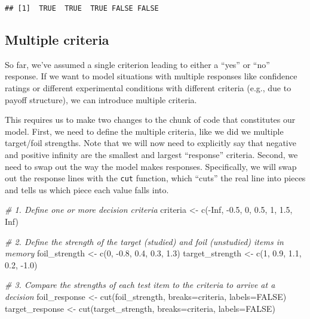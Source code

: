 \documentclass[
]{book}
\newenvironment{Shaded}{\begin{snugshade}}{\end{snugshade}}
\newcommand{\AttributeTok}[1]{\textcolor[rgb]{0.77,0.63,0.00}{#1}}
\newcommand{\CommentTok}[1]{\textcolor[rgb]{0.56,0.35,0.01}{\textit{#1}}}
\newcommand{\ConstantTok}[1]{\textcolor[rgb]{0.00,0.00,0.00}{#1}}
\newcommand{\DecValTok}[1]{\textcolor[rgb]{0.00,0.00,0.81}{#1}}
\newcommand{\FloatTok}[1]{\textcolor[rgb]{0.00,0.00,0.81}{#1}}
\newcommand{\FunctionTok}[1]{\textcolor[rgb]{0.00,0.00,0.00}{#1}}
\newcommand{\NormalTok}[1]{#1}
\newcommand{\OtherTok}[1]{\textcolor[rgb]{0.56,0.35,0.01}{#1}}
\newcommand{\SpecialCharTok}[1]{\textcolor[rgb]{0.00,0.00,0.00}{#1}}
\begin{document}
\begin{verbatim}
## [1]  TRUE  TRUE  TRUE FALSE FALSE
\end{verbatim}

\hypertarget{multiple-criteria}{%
\subsection{Multiple criteria}\label{multiple-criteria}}

So far, we've assumed a single criterion leading to either a ``yes'' or ``no'' response. If we want to model situations with multiple responses like confidence ratings or different experimental conditions with different criteria (e.g., due to payoff structure), we can introduce multiple criteria.

This requires us to make two changes to the chunk of code that constitutes our model. First, we need to define the multiple criteria, like we did we multiple target/foil strengths. Note that we will now need to explicitly say that negative and positive infinity are the smallest and largest ``response'' criteria. Second, we need to swap out the way the model makes responses. Specifically, we will swap out the response lines with the \texttt{cut} function, which ``cuts'' the real line into pieces and tells us which piece each value falls into.

\begin{Shaded}
\begin{Highlighting}[]
\CommentTok{\# 1. Define one or more decision criteria}
\NormalTok{criteria }\OtherTok{\textless{}{-}} \FunctionTok{c}\NormalTok{(}\SpecialCharTok{{-}}\ConstantTok{Inf}\NormalTok{, }\SpecialCharTok{{-}}\FloatTok{0.5}\NormalTok{, }\DecValTok{0}\NormalTok{, }\FloatTok{0.5}\NormalTok{, }\DecValTok{1}\NormalTok{, }\FloatTok{1.5}\NormalTok{, }\ConstantTok{Inf}\NormalTok{)}

\CommentTok{\# 2. Define the strength of the target (studied) and foil (unstudied) items in memory}
\NormalTok{foil\_strength }\OtherTok{\textless{}{-}} \FunctionTok{c}\NormalTok{(}\DecValTok{0}\NormalTok{, }\SpecialCharTok{{-}}\FloatTok{0.8}\NormalTok{, }\FloatTok{0.4}\NormalTok{, }\FloatTok{0.3}\NormalTok{, }\FloatTok{1.3}\NormalTok{)}
\NormalTok{target\_strength }\OtherTok{\textless{}{-}} \FunctionTok{c}\NormalTok{(}\DecValTok{1}\NormalTok{, }\FloatTok{0.9}\NormalTok{, }\FloatTok{1.1}\NormalTok{, }\FloatTok{0.2}\NormalTok{, }\SpecialCharTok{{-}}\FloatTok{1.0}\NormalTok{)}

\CommentTok{\# 3. Compare the strengths of each test item to the criteria to arrive at a decision}
\NormalTok{foil\_response }\OtherTok{\textless{}{-}} \FunctionTok{cut}\NormalTok{(foil\_strength, }\AttributeTok{breaks=}\NormalTok{criteria, }\AttributeTok{labels=}\ConstantTok{FALSE}\NormalTok{)}
\NormalTok{target\_response }\OtherTok{\textless{}{-}} \FunctionTok{cut}\NormalTok{(target\_strength, }\AttributeTok{breaks=}\NormalTok{criteria, }\AttributeTok{labels=}\ConstantTok{FALSE}\NormalTok{)}
\end{Highlighting}
\end{Shaded}
\end{document}
